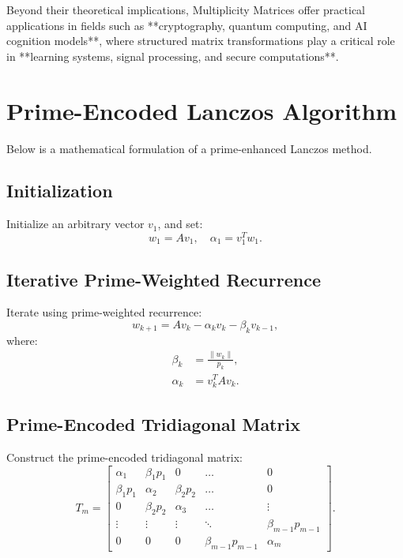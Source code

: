 \documentclass{article}
\theoremstyle{plain}
\begin{document}
Beyond their theoretical implications, Multiplicity Matrices offer practical applications in fields such as **cryptography, quantum computing, and AI cognition models**, where structured matrix transformations play a critical role in **learning systems, signal processing, and secure computations**.
\section{Prime-Encoded Lanczos Algorithm}
Below is a mathematical formulation of a prime-enhanced Lanczos method.

\subsection{Initialization}
Initialize an arbitrary vector $v_1$, and set:
\begin{equation}
    w_1 = A v_1, \quad \alpha_1 = v_1^T w_1.
\end{equation}

\subsection{Iterative Prime-Weighted Recurrence}
Iterate using prime-weighted recurrence:
\begin{equation}
    w_{k+1} = A v_k - \alpha_k v_k - \beta_k v_{k-1},
\end{equation}
where:
\begin{align}
    \beta_k &= \frac{\| w_k \|}{p_k}, \\
    \alpha_k &= v_k^T A v_k.
\end{align}

\subsection{Prime-Encoded Tridiagonal Matrix}
Construct the prime-encoded tridiagonal matrix:
\begin{equation}
    T_m =
    \begin{bmatrix}
        \alpha_1 & \beta_1 p_1 & 0 & \dots & 0 \\
        \beta_1 p_1 & \alpha_2 & \beta_2 p_2 & \dots & 0 \\
        0 & \beta_2 p_2 & \alpha_3 & \dots & \vdots \\
        \vdots & \vdots & \vdots & \ddots & \beta_{m-1} p_{m-1} \\
        0 & 0 & 0 & \beta_{m-1} p_{m-1} & \alpha_m
    \end{bmatrix}.
\end{equation}
\end{document}
